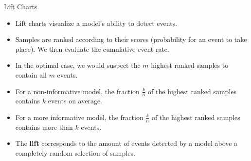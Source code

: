 \documentclass[11pt,compress,t,notes=noshow, aspectratio=169, xcolor=table]{beamer}
\begin{document}
\begin{frame}{Lift Charts}

\begin{itemize}
\setlength\itemsep{2em}
    \item Lift charts visualize a model's ability to detect events.
    \item Samples are ranked according to their scores (probability for an event to take place). We then evaluate the cumulative event rate.
    \item In the optimal case, we would suspect the $m$ highest ranked samples to contain all $m$ events.
    \item For a non-informative model, the fraction $\frac{k}{n}$ of the highest ranked samples contains $k$ events on average.
    \item For a more informative model, the fraction $\frac{k}{n}$ of the highest ranked samples contains more than $k$ events.
    \item The \textbf{lift} corresponds to the amount of events detected by a model above a completely random selection of samples.
\end{itemize}
\end{frame}
\end{document}
